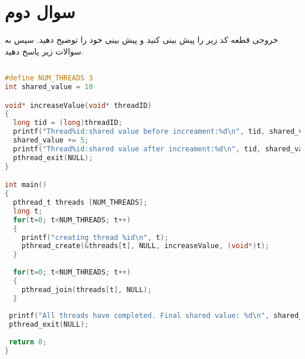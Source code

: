 \section{سوال دوم}

‫خروجی‬ ‫قطعه‬ ‫کد‬ ‫زیر را‬ ‫پیش‬ ‫بینی‬ ‫کنید‬ ‫و‬ ‫پیش‬ ‫بینی‬ ‫خود‬ ‫را‬ ‫توضیح‬ ‫دهید. ‬‬‫سپس‬ ‫به ‬‫سوالات‬ ‫زیر‬ ‫پاسخ‬ ‫دهید‬.

\begin{latin}
\begin{lstlisting}[label=first,caption=Some Code, language=C]
	
#define NUM_THREADS 3
int shared_value = 10

void* ‫‪increaseValu‬‬e(void* ‫‪threadID‬‬)
{
  long tid = (long)threadID‬‬;
  printf("‫‪Thread‬‬%id:shared value before ‫‪increament‬‬:%d\n", tid, shared_value);
  shared_value += 5;
  printf("‫‪Thread‬‬%id:shared value after ‫‪increament‬‬:%d\n", tid, shared_value);
  ‪pthread_exit‬‬(NULL);
}

int main()
{
  ‫‪pthread_t‬‬ ‫‪threads‬‬ [‫‪NUM_THREADS‬‬];
  long t;
  for(t=0; t<NUM_THREADS; t++)
  {
    printf("‫‪creating‬‬ ‫‪thread‬‬ %id\n", t);
	‫‪pthread_create‬‬(&‫‪threads‬‬[t], NULL, ‫‪increaseValue‬‬, (void*)t);
  }
  
  for(t=0; t<NUM_THREADS; t++)
  {
  	‫‪pthread_join‬‬(threads‬‬[t], NULL);
  }
  
 printf("All threads have completed. Final shared value: %d\n", ‫‪shared_value‬‬);
 ‫‪pthread_exit‬‬(NULL);
 
 return 0;
}
	
\end{lstlisting}
\end{latin}




